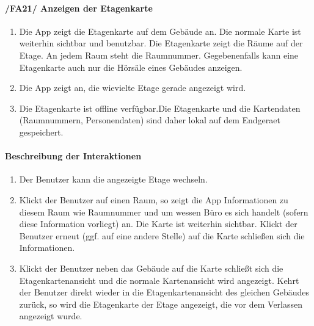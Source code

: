 \paragraph{/FA21/ Anzeigen der Etagenkarte}
\label{/FA21/}
\begin{enumerate}
    \item Die App zeigt die \Gls{Etagenkarte} auf dem Gebäude an. Die normale \Gls{Karte} ist weiterhin sichtbar und benutzbar. 
    Die \Gls{Etagenkarte} zeigt die Räume auf der Etage. An jedem Raum steht die Raumnummer.
    Gegebenenfalls kann eine \Gls{Etagenkarte} auch nur die Hörsäle eines Gebäudes anzeigen.
    \item Die App zeigt an, die wievielte Etage gerade angezeigt wird.
    \item Die \Gls{Etagenkarte} ist \gls{offline} verfügbar.Die \Gls{Etagenkarte} und die Kartendaten (Raumnummern, Personendaten) sind daher \gls{lokal} auf dem \Gls{Endgeraet} gespeichert.
\end{enumerate}
\paragraph{Beschreibung der Interaktionen}
\begin{enumerate}[start=22, label=\textbf{/FA\arabic*/}, align=left]
    \item Der \Gls{Benutzer} kann die angezeigte Etage wechseln.
    \item Klickt der \Gls{Benutzer} auf einen Raum, so zeigt die App Informationen zu diesem Raum wie Raumnummer 
    und um wessen Büro es sich handelt (sofern diese Information vorliegt) an. 
    Die \Gls{Karte} ist weiterhin sichtbar. 
    Klickt der \Gls{Benutzer} erneut (ggf. auf eine andere Stelle) auf die \Gls{Karte} schließen sich die Informationen.
    \item Klickt der \Gls{Benutzer} neben das Gebäude auf die \Gls{Karte} schließt sich die \Gls{Etagenkartenansicht} und die normale \Gls{Kartenansicht} wird angezeigt. Kehrt der \Gls{Benutzer} direkt wieder in die \Gls{Etagenkartenansicht} des gleichen Gebäudes zurück, so wird die \Gls{Etagenkarte} der Etage angezeigt, die vor dem Verlassen angezeigt wurde.
\end{enumerate}